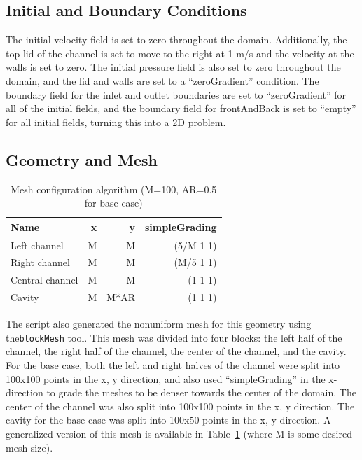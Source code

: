 \documentclass[twocolumn,10pt]{asme2ej}
\begin{document}
\subsection{Initial and Boundary Conditions}
The initial velocity field is set to zero throughout the domain. Additionally, the top lid of the channel is set to move to the right at 1 m/s and the velocity at the walls is set to zero. The initial pressure field is also set to zero throughout the domain, and the lid and walls are set to a ``zeroGradient'' condition. The boundary field for the inlet and outlet boundaries are set to ``zeroGradient'' for all of the initial fields, and the boundary field for frontAndBack is set to ``empty'' for all initial fields, turning this into a 2D problem.

\subsection{Geometry and Mesh}
\begin{table}[b]
\begin{center}
\begin{tabular}{| l | r r r | }
\hline
Name            & x &  y    & simpleGrading \\
\hline
Left channel    & M &  M    & (5/M 1 1) \\
Right channel   & M &  M    & (M/5 1 1) \\
Central channel & M &  M    & (1   1 1) \\
Cavity          & M &  M*AR & (1   1 1) \\
\hline
\end{tabular}
\caption{Mesh configuration algorithm (M=100, AR=0.5 for base case)}
\label{mesh_generation}
\end{center}
\end{table}

The script also generated the nonuniform mesh for this geometry using the\lstinline{blockMesh} tool. This mesh was divided into four blocks: the left half of the channel, the right half of the channel, the center of the channel, and the cavity. For the base case, both the left and right halves of the channel were split into 100x100 points in the x, y direction, and also used ``simpleGrading'' in the x-direction to grade the meshes to be denser towards the center of the domain. The center of the channel was also split into 100x100 points in the x, y direction. The cavity for the base case was split into 100x50 points in the x, y direction. A generalized version of this mesh is available in Table~\ref{mesh_generation} (where M is some desired mesh size).
\end{document}
